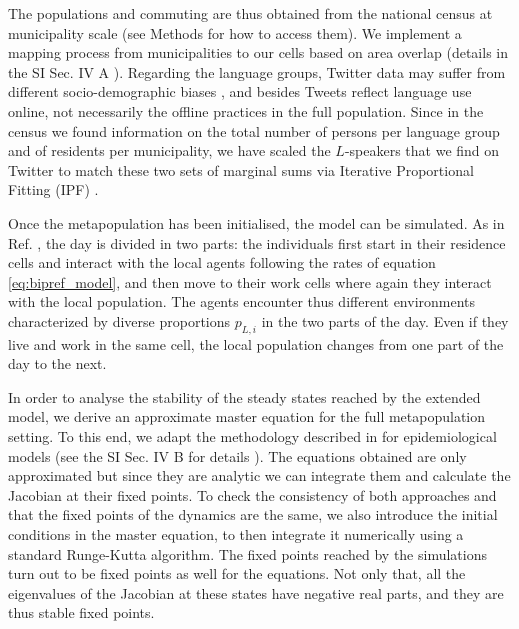 \documentclass[../thesis.tex]{subfiles}
\begin{document}
The populations and commuting are thus obtained from the national census at municipality
scale (see Methods for how to access them). We implement a mapping process from
municipalities to our cells based on area overlap (details in the SI Sec. IV A
\cite{supp}). Regarding the language groups, Twitter data may suffer from different
socio-demographic biases
\cite{MisloveUnderstandingDemographics2011,NguyenAudienceUse2015}, and besides Tweets
reflect language use online, not necessarily the offline practices in the full
population. Since in the census we found information on the total number of persons per
language group and of residents per municipality, we have scaled the $L$-speakers that
we find on Twitter to match these two sets of marginal sums via Iterative Proportional
Fitting (IPF) \cite{DemingLeastSquares1940,FienbergIterativeProcedure1970}.

Once the metapopulation has been initialised, the model can be simulated. As in Ref.
\cite{Fernandez-GraciaVoterModel2014}, the day is divided in two parts: the individuals
first start in their residence cells and interact with the local agents following the
rates of equation \eqref{eq:bipref_model}, and then move to their work cells where again
they interact with the local population. The agents encounter thus different
environments characterized by diverse proportions $p_{L,i}$ in the two parts of the day.
Even if they live and work in the same cell, the local population changes from one part
of the day to the next.

In order to analyse the stability of the steady states reached by the extended model, we
derive an approximate master equation for the full metapopulation setting. To this end,
we adapt the methodology described in 
\cite{SattenspielStructuredEpidemic1995,BalcanModelingSpatial2010} for epidemiological
models (see the SI Sec. IV B for details \cite{supp}). The equations obtained are only
approximated but since they are analytic we can integrate them and calculate the
Jacobian at their fixed points. To check the consistency of both approaches and that the
fixed points of the dynamics are the same, we also introduce the initial conditions in
the master equation, to then integrate it numerically using a standard Runge-Kutta
algorithm. The fixed points reached by the simulations turn out to be fixed points as
well for the equations. Not only that, all the eigenvalues of the Jacobian at these
states have negative real parts, and they are thus stable fixed points.
\end{document}
